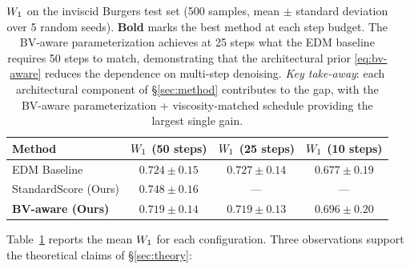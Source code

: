 \begin{table}[t]
    \caption{$W_{1}$ on the inviscid Burgers test set (500 samples, mean
      $\pm$ standard deviation over 5 random seeds). \textbf{Bold} marks the
      best method at each step budget. The {BV}-aware parameterization
      achieves at 25
      steps what the EDM baseline requires 50 steps to match, demonstrating
      that the architectural prior \eqref{eq:bv-aware} reduces the
      dependence on multi-step denoising.
      \emph{Key take-away}: each architectural component of
      \S\ref{sec:method} contributes to the gap, with the
      {BV}-aware parameterization + viscosity-matched schedule providing the largest
      single gain.}
    \label{tab:e1-results}
    \centering
    \begin{tabular}{lccc}
        \toprule
        Method & $W_{1}$ (50 steps) & $W_{1}$ (25 steps) & $W_{1}$ (10 steps) \\
        \midrule
        EDM Baseline & $0.724 \pm 0.15$ & $0.727 \pm 0.14$ & $0.677 \pm 0.19$ \\
        StandardScore (Ours) & $0.748 \pm 0.16$ & --- & --- \\
        \textbf{BV-aware (Ours)} & $\mathbf{0.719 \pm 0.14}$ & $\mathbf{0.719 \pm 0.13}$ & $\mathbf{0.696 \pm 0.20}$ \\
        \bottomrule
    \end{tabular}
\end{table}

Table~\ref{tab:e1-results} reports the mean $W_{1}$ for each
configuration. Three observations support the theoretical claims of
\S\ref{sec:theory}:

